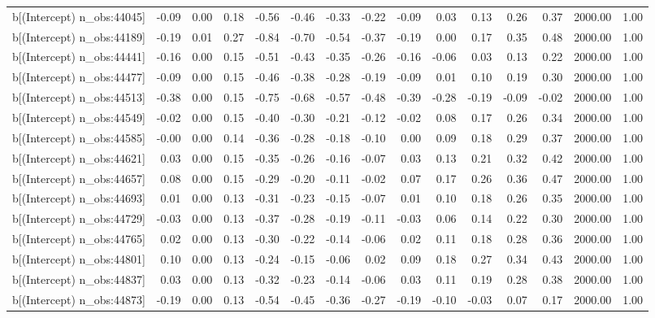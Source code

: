 \begin{table}[ht]
\begin{tabular}{rrrrrrrrrrrrrrr}
  b[(Intercept) n\_obs:44045] & -0.09 & 0.00 & 0.18 & -0.56 & -0.46 & -0.33 & -0.22 & -0.09 & 0.03 & 0.13 & 0.26 & 0.37 & 2000.00 & 1.00 \\ 
  b[(Intercept) n\_obs:44189] & -0.19 & 0.01 & 0.27 & -0.84 & -0.70 & -0.54 & -0.37 & -0.19 & 0.00 & 0.17 & 0.35 & 0.48 & 2000.00 & 1.00 \\ 
  b[(Intercept) n\_obs:44441] & -0.16 & 0.00 & 0.15 & -0.51 & -0.43 & -0.35 & -0.26 & -0.16 & -0.06 & 0.03 & 0.13 & 0.22 & 2000.00 & 1.00 \\ 
  b[(Intercept) n\_obs:44477] & -0.09 & 0.00 & 0.15 & -0.46 & -0.38 & -0.28 & -0.19 & -0.09 & 0.01 & 0.10 & 0.19 & 0.30 & 2000.00 & 1.00 \\ 
  b[(Intercept) n\_obs:44513] & -0.38 & 0.00 & 0.15 & -0.75 & -0.68 & -0.57 & -0.48 & -0.39 & -0.28 & -0.19 & -0.09 & -0.02 & 2000.00 & 1.00 \\ 
  b[(Intercept) n\_obs:44549] & -0.02 & 0.00 & 0.15 & -0.40 & -0.30 & -0.21 & -0.12 & -0.02 & 0.08 & 0.17 & 0.26 & 0.34 & 2000.00 & 1.00 \\ 
  b[(Intercept) n\_obs:44585] & -0.00 & 0.00 & 0.14 & -0.36 & -0.28 & -0.18 & -0.10 & 0.00 & 0.09 & 0.18 & 0.29 & 0.37 & 2000.00 & 1.00 \\ 
  b[(Intercept) n\_obs:44621] & 0.03 & 0.00 & 0.15 & -0.35 & -0.26 & -0.16 & -0.07 & 0.03 & 0.13 & 0.21 & 0.32 & 0.42 & 2000.00 & 1.00 \\ 
  b[(Intercept) n\_obs:44657] & 0.08 & 0.00 & 0.15 & -0.29 & -0.20 & -0.11 & -0.02 & 0.07 & 0.17 & 0.26 & 0.36 & 0.47 & 2000.00 & 1.00 \\ 
  b[(Intercept) n\_obs:44693] & 0.01 & 0.00 & 0.13 & -0.31 & -0.23 & -0.15 & -0.07 & 0.01 & 0.10 & 0.18 & 0.26 & 0.35 & 2000.00 & 1.00 \\ 
  b[(Intercept) n\_obs:44729] & -0.03 & 0.00 & 0.13 & -0.37 & -0.28 & -0.19 & -0.11 & -0.03 & 0.06 & 0.14 & 0.22 & 0.30 & 2000.00 & 1.00 \\ 
  b[(Intercept) n\_obs:44765] & 0.02 & 0.00 & 0.13 & -0.30 & -0.22 & -0.14 & -0.06 & 0.02 & 0.11 & 0.18 & 0.28 & 0.36 & 2000.00 & 1.00 \\ 
  b[(Intercept) n\_obs:44801] & 0.10 & 0.00 & 0.13 & -0.24 & -0.15 & -0.06 & 0.02 & 0.09 & 0.18 & 0.27 & 0.34 & 0.43 & 2000.00 & 1.00 \\ 
  b[(Intercept) n\_obs:44837] & 0.03 & 0.00 & 0.13 & -0.32 & -0.23 & -0.14 & -0.06 & 0.03 & 0.11 & 0.19 & 0.28 & 0.38 & 2000.00 & 1.00 \\ 
  b[(Intercept) n\_obs:44873] & -0.19 & 0.00 & 0.13 & -0.54 & -0.45 & -0.36 & -0.27 & -0.19 & -0.10 & -0.03 & 0.07 & 0.17 & 2000.00 & 1.00 \\ 

\end{tabular}
\end{table}
